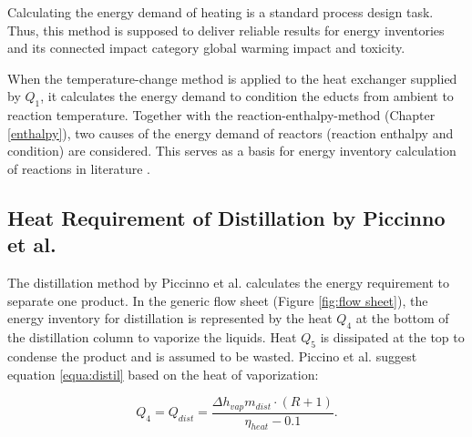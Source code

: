 Calculating the energy demand of heating is a standard process design task. Thus, this method is supposed to deliver reliable results for energy inventories and its connected impact category global warming impact and toxicity.

When the temperature-change method is applied to the heat exchanger supplied by $Q_1$, it calculates the energy demand to condition the educts from ambient to reaction temperature. Together with the reaction-enthalpy-method (Chapter \ref{enthalpy}), two causes of the energy demand of reactors (reaction enthalpy and condition) are considered. This serves as a basis for energy inventory calculation of reactions in literature \cite{Parvatker.2019}.





\subsection{Heat Requirement of Distillation by Piccinno et al.}
The distillation method by Piccinno et al. calculates the energy requirement to separate one product.  In the generic flow sheet (Figure \ref{fig:flow sheet}), the energy inventory for distillation is represented by the %
heat $Q_4$ at the bottom of the distillation column to vaporize the liquids.  Heat $Q_5$ is dissipated at the top to condense the product and is assumed to be wasted. Piccino et al. \cite{Piccinno.2016} suggest equation \ref{equa:distil} based on the heat of vaporization:

\begin{equation}
\label{equa:distil}
    Q_4=Q_{dist}=\frac{\Delta h_{vap}m_{dist}\cdot(R+1)}{\eta_{heat}-0.1}. %
\end{equation}

